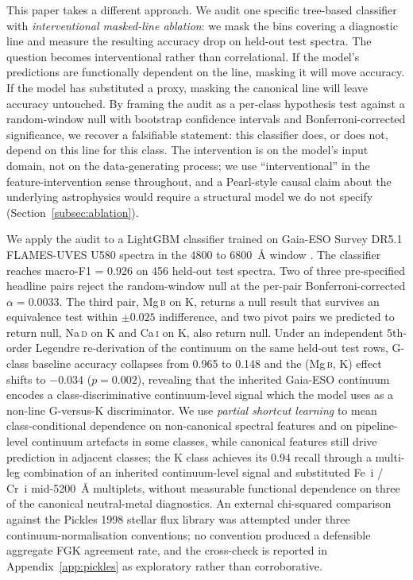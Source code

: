 \documentclass[11pt,a4paper]{article}
\newcommand{\Mgb}{Mg\,\textsc{b}\xspace}
\newcommand{\NaD}{Na\,\textsc{d}\xspace}
\newcommand{\CaI}{Ca\,\textsc{i}\xspace}
\begin{document}
This paper takes a different approach. We audit one specific tree-based classifier with \emph{interventional masked-line ablation}: we mask the bins covering a diagnostic line and measure the resulting accuracy drop on held-out test spectra. The question becomes interventional rather than correlational. If the model's predictions are functionally dependent on the line, masking it will move accuracy. If the model has substituted a proxy, masking the canonical line will leave accuracy untouched. By framing the audit as a per-class hypothesis test against a random-window null with bootstrap confidence intervals and Bonferroni-corrected significance, we recover a falsifiable statement: this classifier does, or does not, depend on this line for this class. The intervention is on the model's input domain, not on the data-generating process; we use ``interventional'' in the feature-intervention sense throughout, and a Pearl-style causal claim about the underlying astrophysics would require a structural model we do not specify (Section~\ref{subsec:ablation}).

We apply the audit to a LightGBM classifier \citep{Ke2017LightGBM} trained on Gaia-ESO Survey DR5.1 FLAMES-UVES U580 spectra in the 4800 to 6800~\AA{} window \citep{2014A&A...565A.113S,2023A&A...676A.129H}. The classifier reaches macro-F1 = 0.926 on 456 held-out test spectra. Two of three pre-specified headline pairs reject the random-window null at the per-pair Bonferroni-corrected $\alpha = 0.0033$. The third pair, \Mgb on K, returns a null result that survives an equivalence test within $\pm 0.025$ indifference, and two pivot pairs we predicted to return null, \NaD on K and \CaI on K, also return null. Under an independent 5th-order Legendre re-derivation of the continuum on the same held-out test rows, G-class baseline accuracy collapses from 0.965 to 0.148 and the (\Mgb, K) effect shifts to $-0.034$ ($p = 0.002$), revealing that the inherited Gaia-ESO continuum encodes a class-discriminative continuum-level signal which the model uses as a non-line G-versus-K discriminator. We use \emph{partial shortcut learning} to mean class-conditional dependence on non-canonical spectral features and on pipeline-level continuum artefacts in some classes, while canonical features still drive prediction in adjacent classes; the K class achieves its 0.94 recall through a multi-leg combination of an inherited continuum-level signal and substituted Fe~i / Cr~i mid-5200~\AA{} multiplets, without measurable functional dependence on three of the canonical neutral-metal diagnostics. An external chi-squared comparison against the Pickles 1998 stellar flux library \citep{1998PASP..110..863P} was attempted under three continuum-normalisation conventions; no convention produced a defensible aggregate FGK agreement rate, and the cross-check is reported in Appendix~\ref{app:pickles} as exploratory rather than corroborative.
\end{document}
